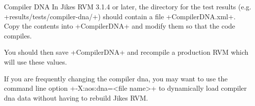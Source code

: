 \begin{section}{Compiler DNA}
In Jikes RVM 3.1.4 or later, the directory for the test results (e.g. \newline \spverb+results/tests/compiler-dna/+) should contain a file \spverb+CompilerDNA.xml+. Copy the contents into \spverb+CompilerDNA+ and modify them so that the code compiles.

You should then save \spverb+CompilerDNA+ and recompile a production RVM which will use these values.

If you are frequently changing the compiler dna, you may want to use the command line option \spverb+-X:aos:dna=<file name>+ to dynamically load compiler dna data without having to rebuild Jikes RVM.


\end{section}
